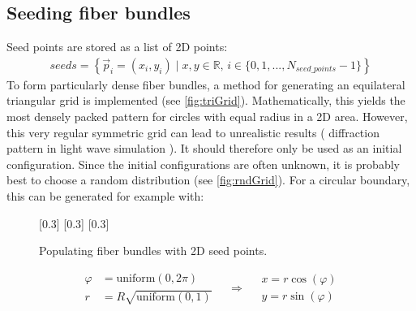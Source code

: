 \subsection{Seeding fiber bundles}\label{sec:seeds}
%
Seed points are stored as a list of 2D points:
\begin{align}
    \mathit{seeds} = \left\{ \vec{p}_i=(x_i,y_i) \mid x,y \in \mathbb{R} , \, i \in \{0,1,...,N_{\mathit{seed\_points}}-1\}\right\}
\end{align}
%
To form particularly dense fiber bundles, a method for generating an equilateral triangular grid is implemented (see \ref{fig:triGrid}).
Mathematically, this yields the most densely packed pattern for circles with equal radius in a 2D area.
However, this very regular symmetric grid can lead to unrealistic results (\eg{} diffraction pattern in light wave simulation \cite{MenzelDissertation}).
It should therefore only be used as an initial configuration.
Since the initial configurations are often unknown, it is probably best to choose a random distribution (see \cref{fig:rndGrid}).
For a circular boundary, this can be generated for example with:
%
\begin{figure}[!t]
    \setlength{\tikzheight}{0.25\textwidth}
    \centering
    [0.3\textwidth]{}
    \hfill
    [0.3\textwidth]{}
    \hfill
    [0.3\textwidth]{}
    \caption{Populating fiber bundles with 2D seed points.}
\end{figure}
% 
\begin{equation}
\begin{split}
\varphi &= \mathrm{uniform}(0,2 \pi) \\
r &= R \sqrt{\mathrm{uniform}(0,1)}
\end{split}
\quad\Rightarrow\quad
\begin{split}
x = r \cos(\varphi)\\
y = r \sin(\varphi)
\end{split}
\end{equation}
%
%
%
